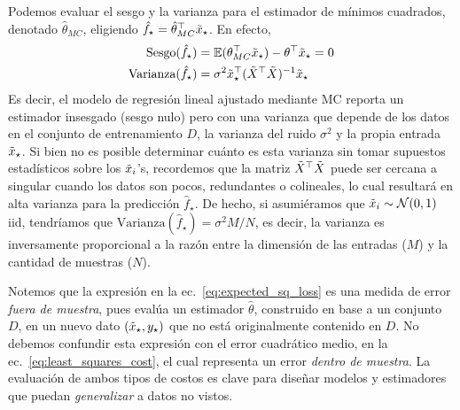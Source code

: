 Podemos evaluar el sesgo y la varianza para el estimador de mínimos cuadrados, denotado $\hat\theta_{MC}$, eligiendo $\hat f_\star = \hat\theta_{MC}^\top\tilde{x}_\star$. En efecto,  
\begin{align}
	\text{Sesgo}(\hat f_\star) &= \operatorname{\mathbb{E}}(\theta_{MC}^\top\tilde{x}_\star) - \theta^\top\tilde{x}_\star=0\\
	\text{Varianza}(\hat f_\star) &= \sigma^2 \tilde{x}_\star^\top (\tilde{X}^\top\tilde{X})^{-1}	\tilde{x}_\star
\end{align}
Es decir, el modelo de regresión lineal ajustado mediante MC reporta un estimador insesgado (sesgo nulo) pero con una varianza que depende de los datos en el conjunto de entrenamiento $D$, la varianza del ruido $\sigma^2$ y la propia entrada $\tilde{x}_\star$. Si bien no es posible determinar cuánto es esta varianza sin tomar supuestos estadísticos sobre los $\tilde{x}_i$'s, recordemos que la matriz $\tilde{X}^\top\tilde{X}$ puede ser cercana a singular cuando los datos son pocos, redundantes o colineales, lo cual resultará en alta varianza para la predicción $\hat f_\star$. De hecho, si asumiéramos que $\tilde{x}_i\sim{\mathcal N}(0,1)$ iid, tendríamos que $\text{Varianza}(\hat f_\star) = \sigma^2 M/N$, es decir, la varianza es inversamente proporcional a la razón entre la dimensión de las entradas ($M$) y la cantidad de muestras ($N$).

\begin{mdframed}[style=discusion, frametitle={\center Evaluaciones \emph{dentro de muestra} y \emph{fuera de muestra}}]
 Notemos que la expresión en la ec.~\eqref{eq:expected_sq_loss} es una medida de error \emph{fuera de muestra}, pues evalúa un estimador $\hat\theta$, construido en base a un conjunto $D$, en un nuevo dato $(\tilde{x}_\star,y_\star)$ que no está originalmente contenido en $D$. No debemos confundir esta expresión con el error cuadrático medio, en la ec.~\eqref{eq:least_squares_cost}, el cual representa un error \emph{dentro de muestra}. La  evaluación de ambos tipos de  costos es clave para diseñar modelos y estimadores que puedan \emph{generalizar} a datos no vistos. 
\end{mdframed}

